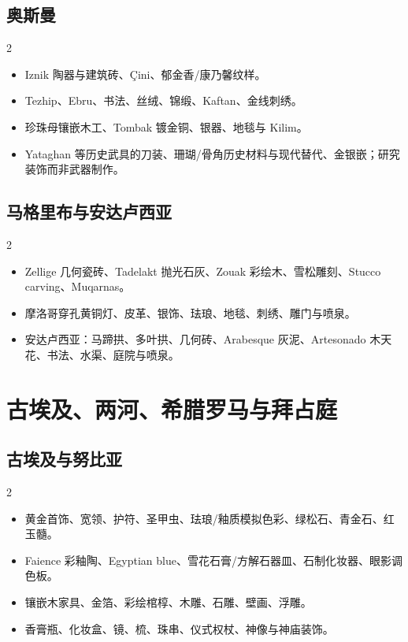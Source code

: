 \documentclass[lang=en,a4paper,11pt]{elegantpaper}
\begin{document}
\subsection{奥斯曼}


\begin{multicols}{2}
\begin{itemize}
\item Iznik 陶器与建筑砖、Çini、郁金香/康乃馨纹样。
\item Tezhip、Ebru、书法、丝绒、锦缎、Kaftan、金线刺绣。
\item 珍珠母镶嵌木工、Tombak 镀金铜、银器、地毯与 Kilim。
\item Yataghan 等历史武具的刀装、珊瑚/骨角历史材料与现代替代、金银嵌；研究装饰而非武器制作。
\end{itemize}
\end{multicols}

\subsection{马格里布与安达卢西亚}


\begin{multicols}{2}
\begin{itemize}
\item Zellige 几何瓷砖、Tadelakt 抛光石灰、Zouak 彩绘木、雪松雕刻、Stucco carving、Muqarnas。
\item 摩洛哥穿孔黄铜灯、皮革、银饰、珐琅、地毯、刺绣、雕门与喷泉。
\item 安达卢西亚：马蹄拱、多叶拱、几何砖、Arabesque 灰泥、Artesonado 木天花、书法、水渠、庭院与喷泉。
\end{itemize}
\end{multicols}

\section{古埃及、两河、希腊罗马与拜占庭}


\subsection{古埃及与努比亚}


\begin{multicols}{2}
\begin{itemize}
\item 黄金首饰、宽领、护符、圣甲虫、珐琅/釉质模拟色彩、绿松石、青金石、红玉髓。
\item Faience 彩釉陶、Egyptian blue、雪花石膏/方解石器皿、石制化妆器、眼影调色板。
\item 镶嵌木家具、金箔、彩绘棺椁、木雕、石雕、壁画、浮雕。
\item 香膏瓶、化妆盒、镜、梳、珠串、仪式权杖、神像与神庙装饰。
\end{itemize}
\end{multicols}
\end{document}
